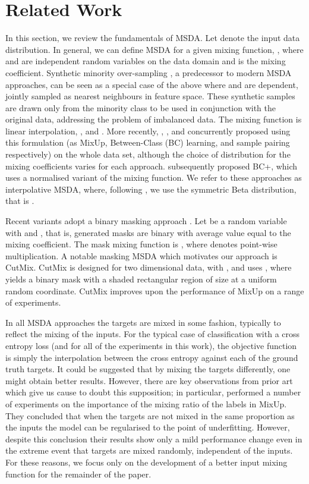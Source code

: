 \documentclass[journal]{IEEEtran}
\newcommand{\mixup}{MixUp\xspace}
\newcommand{\cutmix}{CutMix\xspace}
\begin{document}
\section{Related Work}\label{sec:related}
In this section, we review the fundamentals of MSDA.
Let  denote the input data distribution. In general, we can define MSDA for a given mixing function, , where  and  are independent random variables on the data domain and  is the mixing coefficient. Synthetic minority over-sampling \citep{chawla2002smote}, a predecessor to modern MSDA approaches, can be seen as a special case of the above where  and  are dependent, jointly sampled as nearest neighbours in feature space. These synthetic samples are drawn only from the minority class to be used in conjunction with the original data, addressing the problem of imbalanced data. The mixing function is linear interpolation, , and . More recently, \citet{zhang2017mixup}, \citet{tokozume2017learning}, and \citet{inoue2018data} concurrently proposed using this formulation (as \mixup, Between-Class (BC) learning, and sample pairing respectively) on the whole data set, although the choice of distribution for the mixing coefficients varies for each approach. \citet{tokozume2018between} subsequently proposed BC+, which uses a normalised variant of the mixing function. We refer to these approaches as interpolative MSDA, where, following \citet{zhang2017mixup}, we use the symmetric Beta distribution, that is .

Recent variants adopt a binary masking approach \citep{yun2019cutmix,summers2019improved,takahashi2019data}. 
Let  be a random variable with  and , that is, generated masks are binary with average value equal to the mixing coefficient.
The mask mixing function is , where  denotes point-wise multiplication.
A notable masking MSDA which motivates our approach is \cutmix \citep{yun2019cutmix}. \cutmix is designed for two dimensional data, with 
, and uses ,
where  yields a binary mask with a shaded rectangular region of size  at a uniform random coordinate. 
\cutmix improves upon the performance of \mixup on a range of experiments.

In all MSDA approaches the targets are mixed in some fashion, typically to reflect the mixing of the inputs. For the typical case of classification with a cross entropy loss (and for all of the experiments in this work), the objective function is simply the interpolation between the cross entropy against each of the ground truth targets.
It could be suggested that by mixing the targets differently, one might obtain better results.
However, there are key observations from prior art which give us cause to doubt this supposition;
in particular, \citet{liang2018understanding} performed a number of experiments on the importance of the mixing ratio of the labels in \mixup. They concluded that when the targets are not mixed in the same proportion as the inputs the model can be regularised to the point of underfitting. However, despite this conclusion their results show only a mild performance change even in the extreme event that targets are mixed randomly, independent of the inputs. For these reasons, we focus only on the development of a better input mixing function for the remainder of the paper.
\end{document}
